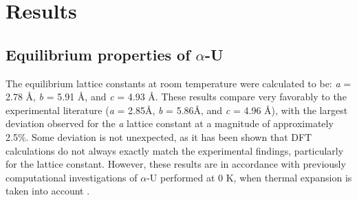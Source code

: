 \documentclass[review]{elsarticle}
\begin{document}

\section{Results}
\subsection{Equilibrium properties of $\alpha$-U}

The equilibrium lattice constants at room temperature were calculated to be: \textit{a} = 2.78 \AA, \textit{b} = 5.91 \AA, and \textit{c} = 4.93 \AA. These results compare very favorably to the experimental literature (\textit{a} = 2.85\AA, \textit{b} = 5.86\AA, and \textit{c} = 4.96 \AA \cite{lawson1988}), with the largest deviation observed for the \textit{a} lattice constant at a magnitude of approximately 2.5\%. Some deviation is not unexpected, as it has been shown that DFT calculations do not always exactly match the experimental findings, particularly for the lattice constant. However, these results are in accordance with previously computational investigations of $\alpha$-U performed at 0 K, when thermal expansion is taken into account \cite{wirth2011,beeler2013}. 
\end{document}
